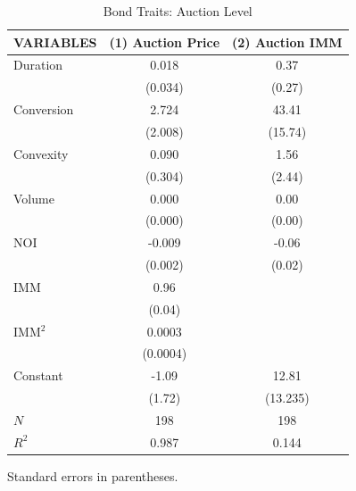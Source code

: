 \begin{table}[htbp]
\centering
\caption{Bond Traits: Auction Level}
\label{tab:os5}
\begin{tabular}{lcc}
\hline\hline
VARIABLES & (1) Auction Price & (2) Auction IMM \\
\hline
Duration & 0.018 & 0.37 \\
 & (0.034) & (0.27) \\
Conversion & 2.724 & 43.41 \\
 & (2.008) & (15.74) \\
Convexity & 0.090 & 1.56 \\
 & (0.304) & (2.44) \\
Volume & 0.000 & 0.00 \\
 & (0.000) & (0.00) \\
NOI & -0.009 & -0.06 \\
 & (0.002) & (0.02) \\
IMM & 0.96 &  \\
 & (0.04) &  \\
IMM$^2$ & 0.0003 &  \\
 & (0.0004) &  \\
Constant & -1.09 & 12.81 \\
 & (1.72) & (13.235) \\
\hline
$N$ & 198 & 198 \\
$R^2$ & 0.987 & 0.144 \\
\hline\hline
\end{tabular}
\begin{tablenotes}\small\item Standard errors in parentheses.\end{tablenotes}
\end{table}
